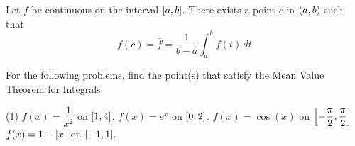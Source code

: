 \documentclass[../mathNotesPreamble]{subfiles}
\begin{document}
\begin{thmBox*}
  Let $f$ be continuous on the interval ${\left[a,b\right]}$. There exists a point $c$ in ${\left(a,b\right)}$ such that 
    \[f(c)=\bar f=\frac{1}{b-a}\int_a^b f(t)\,dt\]
\end{thmBox*}

\begin{ex*}
  For the following problems, find the point(s) that satisfy the Mean Value Theorem for Integrals.
\end{ex*}
\begin{tasks}[after-item-skip=\stretch{1}](1)
  \task $f(x)=\dfrac{1}{x^2}$ on ${\left[1,4\right]}$.
  \task $f(x)=e^x$ on ${\left[0,2\right]}$.
  \task $f(x)=\cos(x)$ on ${\left[-\dfrac{\pi}{2},\dfrac{\pi}{2}\right]}$
  \task $f(x)=1-{\left\vert x\right\vert}$ on ${\left[-1,1\right]}$.
\end{tasks}
\pagebreak
\end{document}
